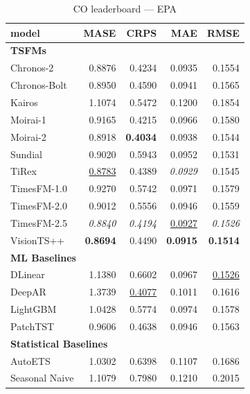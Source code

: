 \begin{table}[H]
\caption{CO leaderboard --- EPA}
\centering
\begin{small}
\begin{tabular}{lrrrr}
\toprule
model & MASE & CRPS & MAE & RMSE \\
\midrule
\multicolumn{5}{l}{\textbf{TSFMs}} \\
Chronos-2 & 0.8876 & 0.4234 & 0.0935 & 0.1554 \\
Chronos-Bolt & 0.8950 & 0.4590 & 0.0941 & 0.1565 \\
Kairos & 1.1074 & 0.5472 & 0.1200 & 0.1854 \\
Moirai-1 & 0.9165 & 0.4215 & 0.0966 & 0.1580 \\
Moirai-2 & 0.8918 & \textbf{0.4034} & 0.0938 & 0.1544 \\
Sundial & 0.9020 & 0.5943 & 0.0952 & 0.1531 \\
TiRex & \underline{0.8783} & 0.4389 & \textit{0.0929} & 0.1545 \\
TimesFM-1.0 & 0.9270 & 0.5742 & 0.0971 & 0.1579 \\
TimesFM-2.0 & 0.9012 & 0.5556 & 0.0946 & 0.1559 \\
TimesFM-2.5 & \textit{0.8840} & \textit{0.4194} & \underline{0.0927} & \textit{0.1526} \\
VisionTS++ & \textbf{0.8694} & 0.4490 & \textbf{0.0915} & \textbf{0.1514} \\
\midrule
\multicolumn{5}{l}{\textbf{ML Baselines}} \\
DLinear & 1.1380 & 0.6602 & 0.0967 & \underline{0.1526} \\
DeepAR & 1.3739 & \underline{0.4077} & 0.1011 & 0.1616 \\
LightGBM & 1.0428 & 0.5774 & 0.0974 & 0.1578 \\
PatchTST & 0.9606 & 0.4638 & 0.0946 & 0.1563 \\
\midrule
\multicolumn{5}{l}{\textbf{Statistical Baselines}} \\
AutoETS & 1.0302 & 0.6398 & 0.1107 & 0.1686 \\
Seasonal Naive & 1.1079 & 0.7980 & 0.1210 & 0.2015 \\
\bottomrule
\end{tabular}
\end{small}
\end{table}